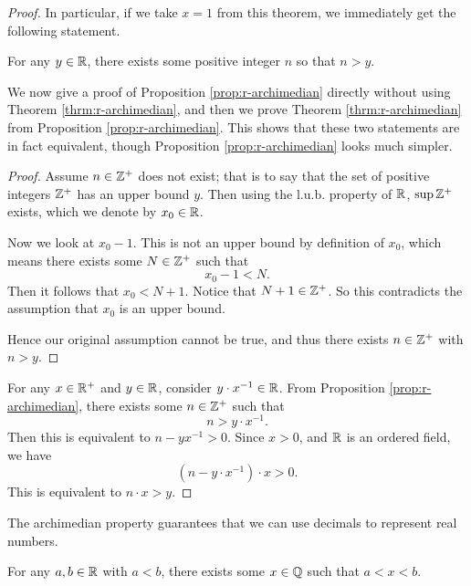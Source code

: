 \begin{proof}
In particular, if we take $x=1$ from this theorem, we immediately get the following statement.

\begin{proposition}\label{prop:r-archimedian}
For any $y\in\mathbb R$, there exists some positive integer $n$ so that $n>y$.
\end{proposition}

We now give a proof of Proposition \ref{prop:r-archimedian} directly without using Theorem \ref{thrm:r-archimedian}, and then we prove Theorem \ref{thrm:r-archimedian} from Proposition \ref{prop:r-archimedian}. This shows that these two statements are in fact equivalent, though Proposition \ref{prop:r-archimedian} looks much simpler.

\begin{proof}
Assume $n\in\mathbb Z^+$ does not exist; that is to say that the set of positive integers $\mathbb Z^+$ has an upper bound $y$. Then using the l.u.b. property of $\RR$, $\sup\mathbb Z^+$ exists, which we denote by $x_0\in\mathbb R$.

Now we look at $x_0-1$. This is not an upper bound by definition of $x_0$, which means there exists some $N\in\mathbb Z^+$ such that
\[x_0-1<N.\]
Then it follows that $x_0<N+1$. Notice that $N+1\in\mathbb Z^+$. So this contradicts the assumption that $x_0$ is an upper bound.

Hence our original assumption cannot be true, and thus there exists $n\in\mathbb Z^+$ with $n>y$.
\end{proof}

For any $x\in\mathbb R^+$ and $y\in\mathbb R$, consider $y\cdot x^{-1}\in\mathbb R$. From Proposition \ref{prop:r-archimedian}, there exists some $n\in\mathbb Z^+$ such that
\[n>y\cdot x^{-1}.\]
Then this is equivalent to $n-yx^{-1}>0$. Since $x>0$, and $\RR$ is an ordered field, we have
\[(n-y\cdot x^{-1})\cdot x>0.\]
This is equivalent to $n\cdot x>y$.
\end{proof}

\begin{remark}
The archimedian property guarantees that we can use decimals to represent real numbers. %
\end{remark}


\begin{theorem}[$\QQ$ is dense in $\RR$]
For any $a,b\in\mathbb R$ with $a<b$, there exists some $x\in\mathbb Q$ such that $a<x<b$.
\end{theorem}

